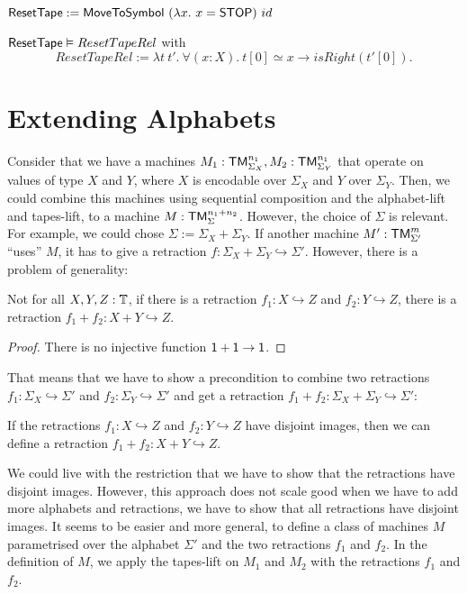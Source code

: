 \begin{definition}[$\MS{ResetTape}$]
  \label{def:Reset}
  $\mathsf{ResetTape} := \mathsf{MoveToSymbol}~(\lambda x.~x=\mathsf{STOP})~id$
\end{definition}

\begin{lemma}
  $\mathsf{ResetTape} \mathrel{\vDash} ResetTapeRel$ with
  \[
    ResetTapeRel := \lambda t~t'.~\forall(x:X).~t[0] \simeq x \rightarrow isRight(t'[0]).
  \]
\end{lemma}


\section{Extending Alphabets}
\label{sec:extend-alphabet}

Consider that we have a machines $M_1 : \mathsf{TM}_{\Sigma_X}^{n_1}, M_2 : \mathsf{TM}_{\Sigma_Y}^{n_1}$ that operate on values of type $X$ and $Y$, where $X$ is
encodable over $\Sigma_X$ and $Y$ over $\Sigma_Y$.  Then, we could combine this machines using sequential composition and the alphabet-lift and
tapes-lift, to a machine $M : \mathsf{TM}_\Sigma^{n_1+n_2}$.  However, the choice of $\Sigma$ is relevant.  For example, we could chose
$\Sigma := \Sigma_X + \Sigma_Y$.  If another machine $M' : \mathsf{TM}_{\Sigma'}^m$ ``uses'' $M$, it has to give a retraction
$f : \Sigma_X+\Sigma_Y \hookrightarrow \Sigma'$.  However, there is a problem of generality:
\begin{fact}
  Not for all $X, Y, Z : \mathbb{T}$, if there is a retraction $f_1 : X \hookrightarrow Z$ and $f_2 : Y \hookrightarrow Z$, there is a retraction
  $f_1+f_2 : X+Y \hookrightarrow Z$.
\end{fact}
\begin{proof}
  There is no injective function $\mathsf{1}+\mathsf{1}\rightarrow\mathsf{1}$.
\end{proof}

That means that we have to show a precondition to combine two retractions $f_1 : \Sigma_X \hookrightarrow \Sigma'$ and
$f_2 : \Sigma_Y \hookrightarrow \Sigma'$ and get a retraction $f_1+f_2 : \Sigma_X + \Sigma_Y \hookrightarrow \Sigma'$:
\begin{fact}
  If the retractions $f_1 : X \hookrightarrow Z$ and $f_2 : Y \hookrightarrow Z$ have disjoint images, then we can define a retraction
  $f_1+f_2 : X+Y \hookrightarrow Z$.
\end{fact}

We could live with the restriction that we have to show that the retractions have disjoint images.  However, this approach does not scale good when we
have to add more alphabets and retractions, we have to show that all retractions have disjoint images.  It seems to be easier and more general, to
define a class of machines $M$ parametrised over the alphabet $\Sigma'$ and the two retractions $f_1$ and $f_2$.  In the definition of $M$, we apply
the tapes-lift on $M_1$ and $M_2$ with the retractions $f_1$ and $f_2$.




